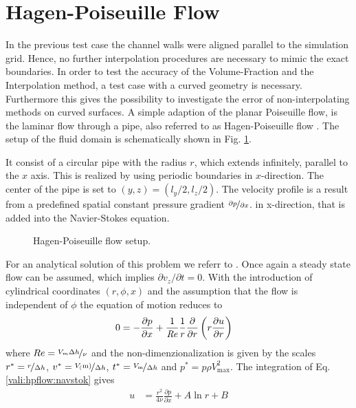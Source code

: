 \section{Hagen-Poiseuille Flow}

In the previous test case the channel walls were aligned parallel to the simulation grid. Hence, no further interpolation procedures
are necessary to mimic the exact boundaries.
In order to test the accuracy of the Volume-Fraction and the Interpolation method, a test case with a curved geometry is necessary.
Furthermore this gives the possibility to investigate the error of non-interpolating methods on curved surfaces.
A simple adaption of the planar Poiseuille flow, is the laminar flow through a pipe, also referred to as Hagen-Poiseuille flow \citep{tritton88}.
The setup of the fluid domain is schematically shown in Fig. \ref{validation:setup_hpflow}.

It consist of a circular pipe with the radius $r$, which extends infinitely, parallel to the $x$ axis.
This is realized by using periodic boundaries in $x$-direction.
The center of the pipe is set to $(y, z) = (l_y/2, l_z/2)$.
The velocity profile is a result from a predefined spatial constant pressure gradient $\nicefrac{\partial p}{\partial x}$.
in x-direction, that is added into the Navier-Stokes equation.


\begin{figure}[!bp]
      \centering
      \caption{Hagen-Poiseuille flow setup.
                \label{validation:setup_hpflow}
      }
\end{figure}

For an analytical solution of this problem we referr to \citep{Kundu2012}.
Once again a steady state flow can be assumed, which implies $\partial v_z/\partial t = 0$. With the introduction of cylindrical coordinates $(r, \phi, x)$
and the assumption that the flow is independent of $\phi$ the equation of motion reduces to
\begin{align}
    \label{vali:hpflow:navstok}
        0 &= - \frac{\partial p}{\partial x}  +  \frac{1}{\mbox{\textit{Re}}} \frac{1}{r}\frac{\partial}{\partial r}\left(r\frac{\partial u}{\partial r}\right)
\end{align}
where $Re = \nicefrac{V_{m}\Delta h}{\nu}$
and the non-dimenzionalization is given by the scales
    $r^* = \nicefrac{r}{\Delta h}$, $v^*=\nicefrac{V_(\text{m})}{\Delta h}$,
    $t^* = \nicefrac{V_{\text{m}}}{\Delta h}$ and $p^* = p \rho V_{\text{max}}^2$.
The integration of Eq. \ref{vali:hpflow:navstok} gives
\begin{align}
    u &= \frac{r^2}{4\nu}\frac{\partial p}{\partial x} + A \ln r + B
\end{align}

